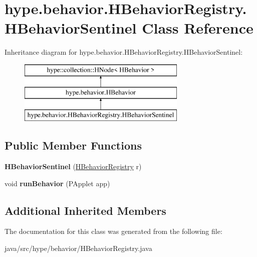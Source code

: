 \hypertarget{classhype_1_1behavior_1_1_h_behavior_registry_1_1_h_behavior_sentinel}{\section{hype.\-behavior.\-H\-Behavior\-Registry.\-H\-Behavior\-Sentinel Class Reference}
\label{classhype_1_1behavior_1_1_h_behavior_registry_1_1_h_behavior_sentinel}
}
Inheritance diagram for hype.\-behavior.\-H\-Behavior\-Registry.\-H\-Behavior\-Sentinel\-:\begin{figure}[H]
\begin{center}
\leavevmode
\includegraphics[height=3.000000cm]{classhype_1_1behavior_1_1_h_behavior_registry_1_1_h_behavior_sentinel}
\end{center}
\end{figure}
\subsection*{Public Member Functions}
\begin{DoxyCompactItemize}
\item 
\hypertarget{classhype_1_1behavior_1_1_h_behavior_registry_1_1_h_behavior_sentinel_ad19e3049bce559d32214edc727275579}{{\bfseries H\-Behavior\-Sentinel} (\hyperlink{classhype_1_1behavior_1_1_h_behavior_registry}{H\-Behavior\-Registry} r)}\label{classhype_1_1behavior_1_1_h_behavior_registry_1_1_h_behavior_sentinel_ad19e3049bce559d32214edc727275579}

\item 
\hypertarget{classhype_1_1behavior_1_1_h_behavior_registry_1_1_h_behavior_sentinel_aa94b5f24536ba4d83c3ca320fda8d151}{void {\bfseries run\-Behavior} (P\-Applet app)}\label{classhype_1_1behavior_1_1_h_behavior_registry_1_1_h_behavior_sentinel_aa94b5f24536ba4d83c3ca320fda8d151}

\end{DoxyCompactItemize}
\subsection*{Additional Inherited Members}


The documentation for this class was generated from the following file\-:\begin{DoxyCompactItemize}
\item 
java/src/hype/behavior/H\-Behavior\-Registry.\-java\end{DoxyCompactItemize}
